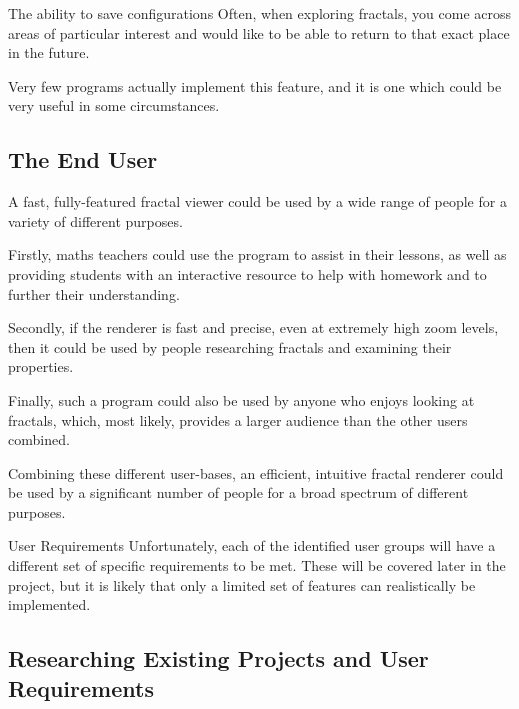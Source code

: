 \begin{greybox}{The ability to save configurations}
	Often, when exploring fractals, you come across areas of particular interest and would like to be able to return to that exact place in the future.
	
	\vspace{0.25cm}
	
	Very few programs actually implement this feature, and it is one which could be very useful in some circumstances.
\end{greybox}

\vspace{0.25cm}

\subsection{The End User}

A fast, fully-featured fractal viewer could be used by a wide range of people for a variety of different purposes.

Firstly, maths teachers could use the program to assist in their lessons, as well as providing students with an interactive resource to help with homework and to further their understanding.

Secondly, if the renderer is fast and precise, even at extremely high zoom levels, then it could be used by people researching fractals and examining their properties.

Finally, such a program could also be used by anyone who enjoys looking at fractals, which, most likely, provides a larger audience than the other users combined.

Combining these different user-bases, an efficient, intuitive fractal renderer could be used by a significant number of people for a broad spectrum of different purposes.

\vspace{0.5cm}

\begin{greenbox}{User Requirements}
	Unfortunately, each of the identified user groups will have a different set of specific requirements to be met. These will be covered later in the project, but it is likely that only a limited set of features can realistically be implemented.
\end{greenbox}

\subsection{Researching Existing Projects and User Requirements}

